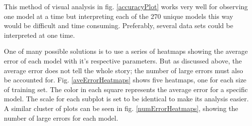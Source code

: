 \par This method of visual analysis in fig. \ref{accuracyPlot} works very well for observing one model at a time but interpreting each of the 270 unique models this way would be difficult and time consuming. Preferably, several data sets could be interpreted at one time.
\par One of many possible solutions is to use a series of heatmaps showing the average error of each model with it's respective parameters. But as discussed above, the average error does not tell the whole story; the number of large errors must also be accounted for. Fig. \ref{aveErrorHeatmaps} shows five heatmaps, one for each size of training set. The color in each square represents the average error for a specific model. The scale for each subplot is set to be identical to make its analysis easier. A similar cluster of plots can be seen in fig. \ref{numErrorHeatmaps}, showing the number of large errors for each model. 

